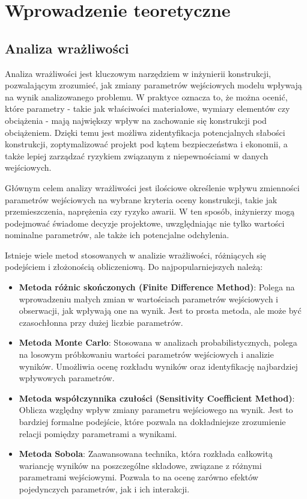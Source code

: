 \newpage
\section{Wprowadzenie teoretyczne}

\subsection{Analiza wrażliwości}

Analiza wrażliwości jest kluczowym narzędziem w inżynierii konstrukcji, pozwalającym zrozumieć, jak zmiany parametrów wejściowych modelu wpływają na wynik analizowanego problemu.
W praktyce oznacza to, że można ocenić, które parametry - takie jak właściwości materiałowe, wymiary elementów czy obciążenia - mają największy wpływ na zachowanie się konstrukcji pod obciążeniem.
Dzięki temu jest możliwa zidentyfikacja potencjalnych słabości konstrukcji, zoptymalizować projekt pod kątem bezpieczeństwa i ekonomii, a także lepiej zarządzać ryzykiem związanym z niepewnościami w danych wejściowych.

Głównym celem analizy wrażliwości jest ilościowe określenie wpływu zmienności parametrów wejściowych na wybrane kryteria oceny konstrukcji, takie jak przemieszczenia, naprężenia czy ryzyko awarii.
W ten sposób, inżynierzy mogą podejmować świadome decyzje projektowe, uwzględniając nie tylko wartości nominalne parametrów, ale także ich potencjalne odchylenia.

Istnieje wiele metod stosowanych w analizie wrażliwości, różniących się podejściem i złożonością obliczeniową.
Do najpopularniejszych należą:

\begin{itemize}
    \item \textbf{Metoda różnic skończonych (Finite Difference Method)}: Polega na wprowadzeniu małych zmian w wartościach parametrów wejściowych i obserwacji, jak wpływają one na wynik. Jest to prosta metoda, ale może być czasochłonna przy dużej liczbie parametrów.
    \item \textbf{Metoda Monte Carlo}: Stosowana w analizach probabilistycznych, polega na losowym próbkowaniu wartości parametrów wejściowych i analizie wyników. Umożliwia ocenę rozkładu wyników oraz identyfikację najbardziej wpływowych parametrów.
    \item \textbf{Metoda współczynnika czułości (Sensitivity Coefficient Method)}: Oblicza względny wpływ zmiany parametru wejściowego na wynik. Jest to bardziej formalne podejście, które pozwala na dokładniejsze zrozumienie relacji pomiędzy parametrami a wynikami.
    \item \textbf{Metoda Sobola}: Zaawansowana technika, która rozkłada całkowitą wariancję wyników na poszczególne składowe, związane z różnymi parametrami wejściowymi. Pozwala to na ocenę zarówno efektów pojedynczych parametrów, jak i ich interakcji.
\end{itemize}

